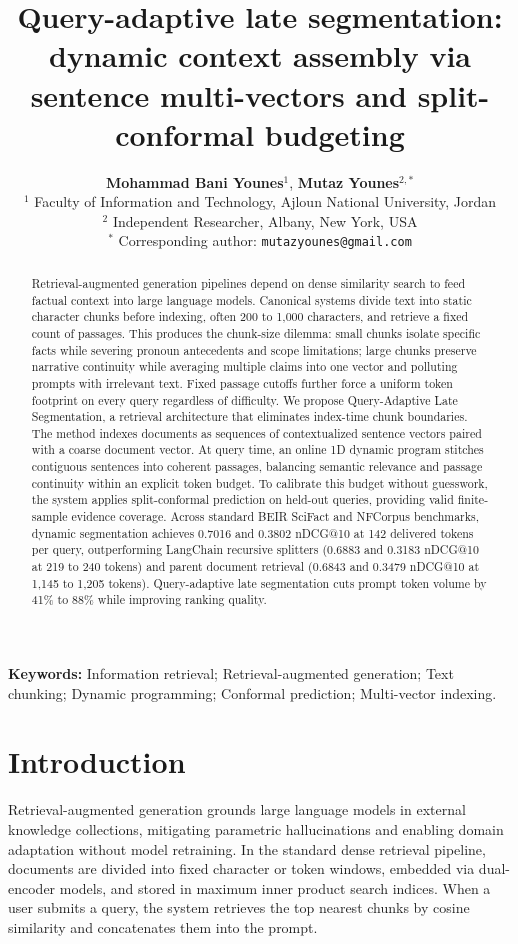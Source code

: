 \documentclass[preprint,12pt]{article}
\title{\textbf{Query-adaptive late segmentation: dynamic context assembly via sentence multi-vectors and split-conformal budgeting}}
\author{
  \textbf{Mohammad Bani Younes}$^1$,
  \textbf{Mutaz Younes}$^{2,*}$ \\
  \small $^1$ Faculty of Information and Technology, Ajloun National University, Jordan \\
  \small $^2$ Independent Researcher, Albany, New York, USA \\
  \small $^*$ Corresponding author: \texttt{mutazyounes@gmail.com}
}
\date{}
\begin{document}
\maketitle

\begin{abstract}
Retrieval-augmented generation pipelines depend on dense similarity search to feed factual context into large language models. Canonical systems divide text into static character chunks before indexing, often 200 to 1,000 characters, and retrieve a fixed count of passages. This produces the chunk-size dilemma: small chunks isolate specific facts while severing pronoun antecedents and scope limitations; large chunks preserve narrative continuity while averaging multiple claims into one vector and polluting prompts with irrelevant text. Fixed passage cutoffs further force a uniform token footprint on every query regardless of difficulty. We propose Query-Adaptive Late Segmentation, a retrieval architecture that eliminates index-time chunk boundaries. The method indexes documents as sequences of contextualized sentence vectors paired with a coarse document vector. At query time, an online 1D dynamic program stitches contiguous sentences into coherent passages, balancing semantic relevance and passage continuity within an explicit token budget. To calibrate this budget without guesswork, the system applies split-conformal prediction on held-out queries, providing valid finite-sample evidence coverage. Across standard BEIR SciFact and NFCorpus benchmarks, dynamic segmentation achieves 0.7016 and 0.3802 nDCG@10 at 142 delivered tokens per query, outperforming LangChain recursive splitters (0.6883 and 0.3183 nDCG@10 at 219 to 240 tokens) and parent document retrieval (0.6843 and 0.3479 nDCG@10 at 1,145 to 1,205 tokens). Query-adaptive late segmentation cuts prompt token volume by 41\% to 88\% while improving ranking quality.
\end{abstract}

\noindent\textbf{Keywords:} Information retrieval; Retrieval-augmented generation; Text chunking; Dynamic programming; Conformal prediction; Multi-vector indexing.

\section{Introduction}
Retrieval-augmented generation grounds large language models in external knowledge collections, mitigating parametric hallucinations and enabling domain adaptation without model retraining. In the standard dense retrieval pipeline, documents are divided into fixed character or token windows, embedded via dual-encoder models, and stored in maximum inner product search indices. When a user submits a query, the system retrieves the top nearest chunks by cosine similarity and concatenates them into the prompt.
\end{document}
